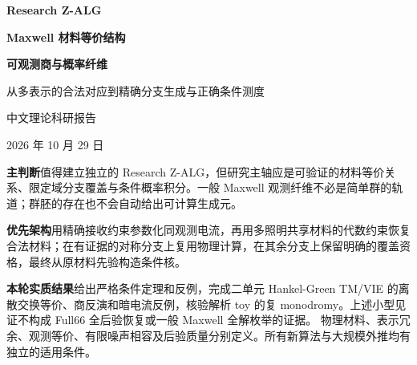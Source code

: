 \documentclass[11pt,a4paper]{article}
\theoremstyle{definition}\newtheorem{example}[proposition]{例}
\begin{document}
\begin{titlepage}
\vspace*{18mm}
{\LARGE\bfseries Research Z-ALG\par}
\vspace{10mm}
{\huge\bfseries Maxwell 材料等价结构\par}
\vspace{4mm}
{\huge\bfseries 可观测商与概率纤维\par}
\vspace{12mm}
{\large 从多表示的合法对应到精确分支生成与正确条件测度\par}
\vspace{12mm}
{\large 中文理论科研报告\par}
{\normalsize 2026 年 10 月 29 日\par}
\vspace{12mm}
\textbf{主判断}\quad 值得建立独立的 Research Z-ALG，但研究主轴应是可验证的材料等价关系、限定域分支覆盖与条件概率积分。一般 Maxwell 观测纤维不必是简单群的轨道；群胚的存在也不会自动给出可计算生成元。

\textbf{优先架构}\quad 用精确接收约束参数化同观测电流，再用多照明共享材料的代数约束恢复合法材料；在有证据的对称分支上复用物理计算，在其余分支上保留明确的覆盖资格，最终从原材料先验构造条件核。

\textbf{本轮实质结果}\quad 给出严格条件定理和反例，完成二单元 Hankel-Green TM/VIE 的离散交换等价、商反演和暗电流反例，核验解析 toy 的复 monodromy。上述小型见证不构成 Full66 全后验恢复或一般 Maxwell 全解枚举的证据。
\vfill
\small 物理材料、表示冗余、观测等价、有限噪声相容及后验质量分别定义。所有新算法与大规模外推均有独立的适用条件。
\end{titlepage}
\tableofcontents
\newpage
{}







\end{document}
